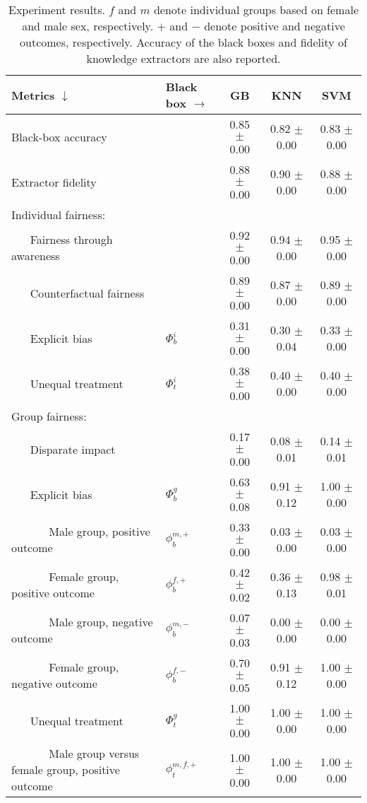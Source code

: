\documentclass[letterpaper]{article} %
\begin{document}
\begin{table*}[t!]
	\begin{center}{\caption{Experiment results. $f$ and $m$ denote individual groups based on female and male sex, respectively. $+$ and $-$ denote positive and negative outcomes, respectively. Accuracy of the black boxes and fidelity of knowledge extractors are also reported.}\label{tab:res}}
		\begin{tabular}{ll|c|c|c}
			\toprule
			Metrics $\downarrow$ & Black box $\rightarrow$ & GB & KNN & SVM \\
			\midrule
			Black-box accuracy & & 0.85 $\pm$ 0.00 & 0.82 $\pm$ 0.00 & 0.83 $\pm$ 0.00 \\
			Extractor fidelity & & 0.88 $\pm$ 0.00 & 0.90 $\pm$ 0.00 & 0.88 $\pm$ 0.00 \\
			\midrule
			Individual fairness: & & & & \\
			~ ~ Fairness through awareness & & 0.92 $\pm$ 0.00 & 0.94 $\pm$ 0.00 & 0.95 $\pm$ 0.00 \\
			~ ~ Counterfactual fairness & & 0.89 $\pm$ 0.00 & 0.87 $\pm$ 0.00 & 0.89 $\pm$ 0.00 \\
			~ ~ Explicit bias & $\Phi_b^i$ & 0.31 $\pm$ 0.00 & 0.30 $\pm$ 0.04 & 0.33 $\pm$ 0.00 \\
			~ ~ Unequal treatment & $\Phi_t^i$ & 0.38 $\pm$ 0.00 & 0.40 $\pm$ 0.00 & 0.40 $\pm$ 0.00 \\
			\midrule
			Group fairness: & & & & \\
			~ ~ Disparate impact & & 0.17 $\pm$ 0.00 & 0.08 $\pm$ 0.01 & 0.14 $\pm$ 0.01 \\
			~ ~ Explicit bias & $\Phi_b^g$ & 0.63 $\pm$ 0.08 & 0.91 $\pm$ 0.12 & 1.00 $\pm$ 0.00 \\
			~ ~ ~ ~ Male group, positive outcome & $\phi_b^{m,+}$ & 0.33 $\pm$ 0.00 & 0.03 $\pm$ 0.00 & 0.03 $\pm$ 0.00 \\
			~ ~ ~ ~ Female group, positive outcome & $\phi_b^{f,+}$ & 0.42 $\pm$ 0.02 & 0.36 $\pm$ 0.13 & 0.98 $\pm$ 0.01 \\
			~ ~ ~ ~ Male group, negative outcome & $\phi_b^{m,-}$ & 0.07 $\pm$ 0.03 & 0.00 $\pm$ 0.00 & 0.00 $\pm$ 0.00 \\
			~ ~ ~ ~ Female group, negative outcome & $\phi_b^{f,-}$ & 0.70 $\pm$ 0.05 & 0.91 $\pm$ 0.12 & 1.00 $\pm$ 0.00 \\
			~ ~ Unequal treatment & $\Phi_t^g$ & 1.00 $\pm$ 0.00 & 1.00 $\pm$ 0.00 & 1.00 $\pm$ 0.00 \\
			~ ~ ~ ~ Male group versus female group, positive outcome & $\phi_t^{m,f,+}$ & 1.00 $\pm$ 0.00 & 1.00 $\pm$ 0.00 & 1.00 $\pm$ 0.00 \\

\end{tabular}
\end{center}
\end{table*}
\end{document}
